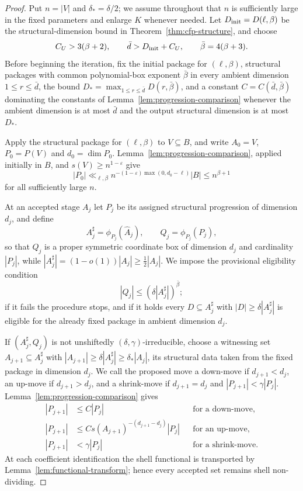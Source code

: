 \documentclass[11pt,reqno]{amsart}
\theoremstyle{definition}
\theoremstyle{remark}
\newcommand{\eps}{\varepsilon}
\begin{document}
\begin{proof}
Put $n=|V|$ and $\delta_*=\delta/2$; we assume throughout that $n$ is
sufficiently large in the fixed parameters and enlarge $K$ whenever
needed.  Let $D_{\rm init}=D(\ell,\beta)$ be the structural-dimension
bound in Theorem~\ref{thm:cfp-structure}, and choose
\[
 C_U>3(\beta+2),
 \qquad
 \bar d>D_{\rm init}+C_U,
 \qquad
 \bar\beta=4(\beta+3).
\]
Before beginning the iteration, fix the initial package for
$(\ell,\beta)$, structural packages with common polynomial-box exponent
$\bar\beta$ in every ambient dimension $1\le r\le\bar d$, the bound
$D_*=\max_{1\le r\le\bar d}D(r,\bar\beta)$, and a constant
$C=C(\bar d,\bar\beta)$ dominating the constants of
Lemma~\ref{lem:progression-comparison} whenever the ambient dimension is
at most $\bar d$ and the output structural dimension is at most $D_*$.

Apply the structural package for $(\ell,\beta)$ to $V\subseteq B$, and write
$A_0=V$, $P_0=P(V)$ and $d_0=\dim P_0$.  Lemma~\ref{lem:progression-comparison},
applied initially in $B$, and $s(V)\ge n^{1-\eps}$ give
\begin{equation}
\label{eq:initial-progression-bound}
 |P_0|\ll_{\ell,\beta}
 n^{-(1-\eps)\max(0,d_0-\ell)}|B|
 \le n^{\beta+1}
\end{equation}
for all sufficiently large $n$.

At an accepted stage $A_j$ let $P_j$ be its assigned structural progression
of dimension $d_j$, and define
\[
 A_j^\sharp=\phi_{P_j}(\widehat A_j),
 \qquad Q_j=\phi_{P_j}(P_j),
\]
so that $Q_j$ is a proper symmetric coordinate box of dimension $d_j$ and
cardinality $|P_j|$, while
$|A_j^\sharp|=(1-o(1))|A_j|\ge\frac12|A_j|$.  We impose the provisional
eligibility condition
\begin{equation}
\label{eq:package-eligibility}
 |Q_j|\le(\delta|A_j^\sharp|)^{\bar\beta};
\end{equation}
if it fails the procedure stops, and if it holds every
$D\subseteq A_j^\sharp$ with $|D|\ge\delta|A_j^\sharp|$ is eligible for the
already fixed package in ambient dimension $d_j$.

If $(A_j^\sharp,Q_j)$ is not unshiftedly
$(\delta,\gamma)$-irreducible, choose a witnessing set
$A_{j+1}\subseteq A_j^\sharp$ with
$|A_{j+1}|\ge\delta|A_j^\sharp|\ge\delta_*|A_j|$, its structural data
taken from the fixed package in dimension $d_j$.  We call the proposed
move a down-move if $d_{j+1}<d_j$, an up-move if $d_{j+1}>d_j$, and a
shrink-move if $d_{j+1}=d_j$ and $|P_{j+1}|<\gamma|P_j|$.
Lemma~\ref{lem:progression-comparison} gives
\begin{align*}
 |P_{j+1}|&\le C|P_j|&&\text{for a down-move},\\
 |P_{j+1}|&\le C s(A_{j+1})^{-(d_{j+1}-d_j)}|P_j|
     &&\text{for an up-move},\\
 |P_{j+1}|&<\gamma|P_j|&&\text{for a shrink-move}.
\end{align*}
At each coefficient identification the shell functional is transported by
Lemma~\ref{lem:functional-transform}; hence every accepted set remains shell
non-dividing.


\end{proof}
\end{document}
